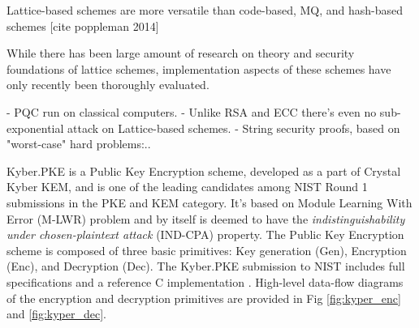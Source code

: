     Lattice-based schemes are more versatile than code-based, MQ, and hash-based schemes [cite poppleman 2014]


    While there has been large amount of research on theory and security foundations of lattice schemes,
     implementation aspects of these schemes have only recently been thoroughly evaluated.





- PQC run on classical computers.
- Unlike RSA and ECC there's even no sub-exponential attack on Lattice-based schemes.
- String security proofs, based on "worst-case" hard problems:..





Kyber.PKE\cite{bos2018} is a Public Key Encryption scheme, developed as a part of Crystal Kyber KEM, 
and is one of the leading candidates among NIST Round 1 submissions in the PKE and KEM category.
 It’s based on Module Learning With Error (M-LWR) problem and by itself is deemed to have
  the \textit{indistinguishability under chosen-plaintext attack} (IND-CPA) property. The Public
   Key Encryption scheme is composed of three basic primitives: Key generation (Gen), 
   Encryption (Enc), and Decryption (Dec). The Kyber.PKE submission to NIST includes full
    specifications and a reference C implementation 
    \cite{kyberres}. High-level data-flow diagrams of
     the encryption and decryption primitives are provided in Fig \ref{fig:kyper_enc} and \ref{fig:kyper_dec}.


